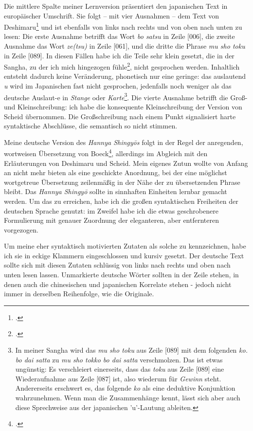 \documentclass[
DIV=calc,
BCOR=5mm,
11pt,
headings=small,
oneside,
bibtotocnumbered]{scrartcl}
\begin{document}
Die mittlere Spalte meiner Lernversion präsentiert den japanischen Text in
europäischer Umschrift. Sie folgt -- mit vier Ausnahmen -- dem Text von
Deshimaru\footcite[vgl.][30]{Deshimaru1988a} und ist ebenfalls von links nach
rechts und von oben nach unten zu lesen: Die erste Ausnahme betrifft das Wort
\emph{bo satsu} in Zeile [006], die zweite Ausnahme das Wort \emph{ze(tsu)} in
Zeile [061], und die dritte die Phrase \emph{mu sho toku} in Zeile [089]. In
diesen Fällen habe ich die Teile sehr klein gesetzt, die in der Sangha, zu der
ich mich hingezogen fühle\footcite[vgl.][\nopage]{DaiShinZen2016a}, nicht
gesprochen werden. Inhaltlich entsteht dadurch keine Veränderung, phonetisch nur
eine geringe: das auslautend \emph{u} wird im Japanischen fast nicht gesprochen,
jedenfalls noch weniger als das deutsche Auslaut-e in \emph{Stange} oder
\emph{Karte}\footnote{In meiner Sangha wird das \emph{mu sho toku} aus Zeile
[089] mit dem folgenden \emph{ko. bo dai satta} zu \emph{mu sho tokko bo dai
satta} verschmolzen. Das ist etwas ungünstig: Es verschleiert einerseits, dass
das \emph{toku} aus Zeile [089] eine Wiederaufnahme aus Zeile [087] ist, also
wiederum für \emph{Gewinn} steht. Andererseits erschwert es, das folgende
\emph{ko} als eine deduktive Konjunktion wahrzunehmen. Wenn man die
Zusammenhänge kennt, lässt sich aber auch diese Sprechweise aus der japanischen
'u'-Lautung ableiten.}. Die vierte Ausnahme betrifft die Groß- und
Kleinschreibung: ich habe die konsequente Kleinschreibung der Version von Scheid
übernommen. Die Großschreibung nach einem Punkt signalisiert harte syntaktische
Abschlüsse, die semantisch so nicht stimmen.

Meine deutsche Version des \emph{Hannya Shingyōs} folgt in der Regel der
anregenden, wortweisen Übersetzung von
Boeck\footcite[vgl.][\nopage]{Boeck2016a}, allerdings im Abgleich mit den
Erläuterungen von Deshimaru und Scheid. Mein eigenes Zutun wollte von Anfang an
nicht mehr bieten als eine geschickte Anordnung, bei der eine möglichst
wortgetreue Übersetzung zeilenmäßig in der Nähe der zu übersetzenden Phrase
bleibt. Das \emph{Hannya Shingyō} sollte in sinnhaften Einheiten lernbar gemacht
werden. Um das zu erreichen, habe ich die großen syntaktischen Freiheiten der
deutschen Sprache genutzt: im Zweifel habe ich die etwas geschrobenere
Formulierung mit genauer Zuordnung der eleganteren, aber entfernteren
vorgezogen.

Um meine eher syntaktisch motivierten Zutaten als solche zu kennzeichnen, habe
ich sie in eckige Klammern eingeschlossen und kursiv gesetzt. Der deutsche Text
sollte sich mit diesen Zutaten schlüssig von links nach rechts und oben nach
unten lesen lassen. Unmarkierte deutsche Wörter sollten in der Zeile stehen, in
denen auch die chinesischen und japanischen Korrelate stehen - jedoch nicht
immer in derselben Reihenfolge, wie die Originale.
\end{document}
